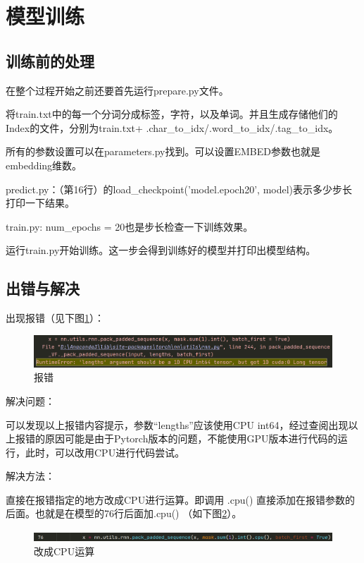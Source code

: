 \documentclass[12pt]{article}
\begin{document}
\section{模型训练}
\subsection{训练前的处理}
在整个过程开始之前还要首先运行prepare.py文件。\par
将train.txt中的每一个分词分成标签，字符，以及单词。并且生成存储他们的Index的文件，分别为train.txt+ .char\_to\_idx/.word\_to\_idx/.tag\_to\_idx。\par
所有的参数设置可以在parameters.py找到。可以设置EMBED参数也就是embedding维数。\par
predict.py：（第16行）的load\_checkpoint('model.epoch20', model)表示多少步长打印一下结果。\par
train.py: num\_epochs = 20也是步长检查一下训练效果。\par
运行train.py开始训练。这一步会得到训练好的模型并打印出模型结构。
\subsection{出错与解决}
出现报错（见下图\ref{111}）：
\begin{figure}[H]
  \centering
  \includegraphics[scale=0.4]{./picture/error.png} %
  \caption{报错} %
  \label{111} %
\end{figure}
解决问题：\par
可以发现以上报错内容提示，参数“lengths”应该使用CPU int64，经过查阅出现以上报错的原因可能是由于Pytorch版本的问题，不能使用GPU版本进行代码的运行，此时，可以改用CPU进行代码尝试。\par
解决方法：\par
直接在报错指定的地方改成CPU进行运算。即调用 .cpu() 直接添加在报错参数的后面。也就是在模型的76行后面加.cpu()
（如下图\ref{sdasadf}）。\par
\begin{figure}[H]
  \centering
  \includegraphics[scale=0.5]{./picture/fixerror.png} %
  \caption{改成CPU运算} %
  \label{sdasadf} %
\end{figure}
\end{document}
